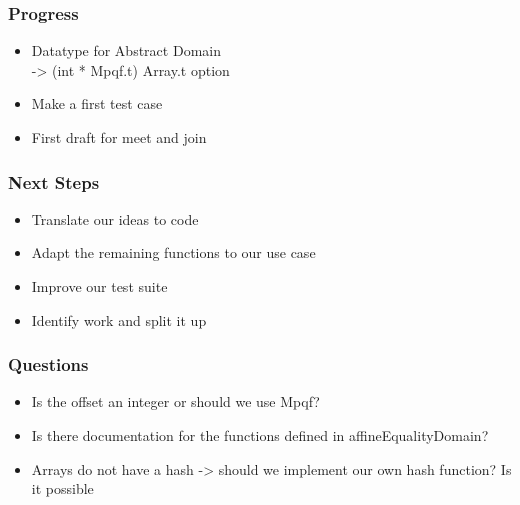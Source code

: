 \documentclass[english,xcolor=table]{i20lecture}
\subtitle{Relational Domains}
\begin{document}

\frame{\titlepage}



\begin{frame}
	\frametitle{Progress}
		\begin{itemize}
			\item Datatype for Abstract Domain\\-> (int * Mpqf.t) Array.t option
			\item Make a first test case
			\item First draft for meet and join
		\end{itemize}
\end{frame}

\begin{frame}
	\frametitle{Next Steps}
	\begin{itemize}
		\item Translate our ideas to code
		\item Adapt the remaining functions to our use case
		\item Improve our test suite
		\item Identify work and split it up
	\end{itemize}
\end{frame}

\begin{frame}
	\frametitle{Questions}
	\begin{itemize}
		\item Is the offset an integer or should we use Mpqf?
		\item Is there documentation for the functions defined in affineEqualityDomain?
		\item Arrays do not have a hash -> should we implement our own hash function? Is it possible
	\end{itemize}
\end{frame}

%	
\end{document}

